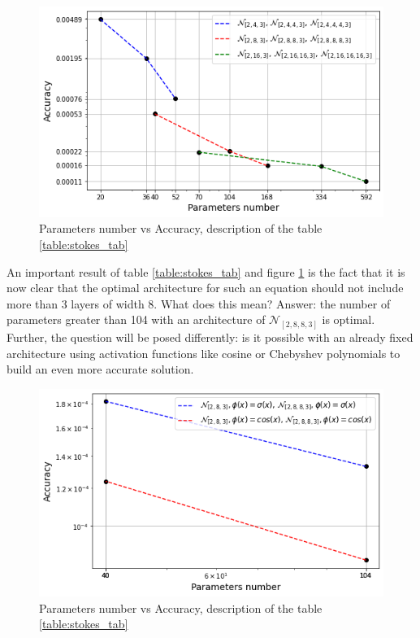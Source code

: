 \begin{figure}
	\centering
	\includegraphics[width=\textwidth]{images/chapter3/stokes_simple_nets_description.png}
	\caption{Parameters number vs Accuracy, description of the table \ref{table:stokes_tab}}
	\label{fig:stokes_simple_nets_description}\tabularnewline
\end{figure}

An important result of table \ref{table:stokes_tab} and figure \ref{fig:stokes_simple_nets_description} is the fact that it is now clear that the optimal architecture for such an equation should not include more than 3 layers of width 8. What does this mean? Answer: the number of parameters greater than 104 with an architecture of $\mathcal{N}_{[2, 8, 8, 3]}$ is optimal. Further, the question will be posed differently: is it possible with an already fixed architecture using activation functions like cosine or Chebyshev polynomials to build an even more accurate solution.

\begin{figure}
	\centering
	\includegraphics[width=\textwidth]{images/chapter3/stokes_simple_nets_cos.png}
	\caption{Parameters number vs Accuracy, description of the table \ref{table:stokes_tab}}
	\label{fig:stokes_simple_nets_cos}\tabularnewline
\end{figure}

